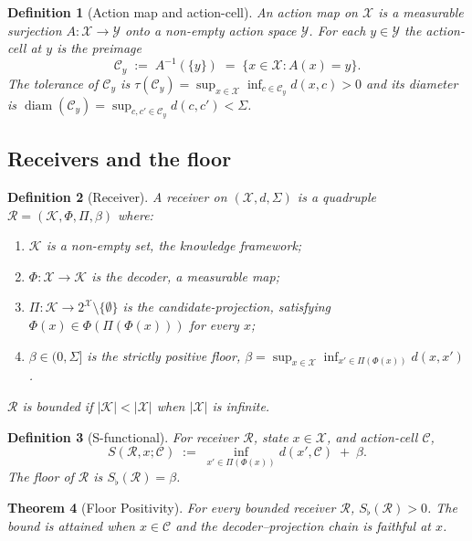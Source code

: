 \documentclass[twocolumn,11pt,a4paper]{article}
\newtheorem{theorem}{Theorem}[section]
\newtheorem{definition}[theorem]{Definition}
\DeclareMathOperator{\diam}{diam}
\newcommand{\Cands}{\mathcal{X}}
\newcommand{\Action}{\mathcal{Y}}
\newcommand{\Knowl}{\mathcal{K}}
\newcommand{\Cell}{\mathcal{C}}
\newcommand{\receiver}{\mathcal{R}}
\newcommand{\Sigmax}{\Sigma}
\newcommand{\Sscalar}{S}
\newcommand{\Sfloor}{S_{\flat}}
\begin{document}
\begin{definition}[Action map and action-cell]
\label{def:action}
An \emph{action map} on $\Cands$ is a measurable surjection $A : \Cands \to \Action$ onto a non-empty action space $\Action$. For each $y \in \Action$ the \emph{action-cell at $y$} is the preimage
\[
\Cell_y \;:=\; A^{-1}(\{y\}) \;=\; \{x \in \Cands : A(x) = y\}.
\]
The \emph{tolerance} of $\Cell_y$ is $\tau(\Cell_y) = \sup_{x \in \Cands} \inf_{c \in \Cell_y} d(x, c) > 0$ and its \emph{diameter} is $\diam(\Cell_y) = \sup_{c, c' \in \Cell_y} d(c, c') < \Sigmax$.
\end{definition}

\subsection{Receivers and the floor}

\begin{definition}[Receiver]
\label{def:receiver}
A \emph{receiver} on $(\Cands, d, \Sigmax)$ is a quadruple $\receiver = (\Knowl, \Phi, \Pi, \beta)$ where:
\begin{enumerate}[nosep, label=(\roman*)]
\item $\Knowl$ is a non-empty set, the \emph{knowledge framework};
\item $\Phi : \Cands \to \Knowl$ is the \emph{decoder}, a measurable map;
\item $\Pi : \Knowl \to 2^{\Cands} \setminus \{\emptyset\}$ is the \emph{candidate-projection}, satisfying $\Phi(x) \in \Phi(\Pi(\Phi(x)))$ for every $x$;
\item $\beta \in (0, \Sigmax]$ is the strictly positive \emph{floor}, $\beta = \sup_{x \in \Cands} \inf_{x' \in \Pi(\Phi(x))} d(x, x')$.
\end{enumerate}
$\receiver$ is \emph{bounded} if $|\Knowl| < |\Cands|$ when $|\Cands|$ is infinite.
\end{definition}

\begin{definition}[S-functional]
\label{def:S-functional}
For receiver $\receiver$, state $x \in \Cands$, and action-cell $\Cell$,
\[
\Sscalar(\receiver, x; \Cell) \;:=\; \inf_{x' \in \Pi(\Phi(x))} d(x', \Cell) \;+\; \beta.
\]
The \emph{floor of $\receiver$} is $\Sfloor(\receiver) = \beta$.
\end{definition}

\begin{theorem}[Floor Positivity]
\label{thm:floor}
For every bounded receiver $\receiver$, $\Sfloor(\receiver) > 0$. The bound is attained when $x \in \Cell$ and the decoder--projection chain is faithful at $x$.
\end{theorem}
\end{document}

